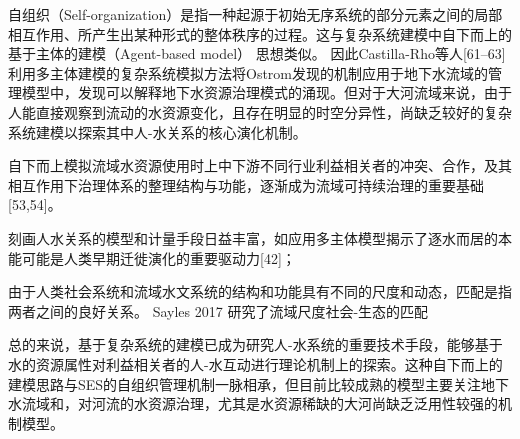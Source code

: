 自组织（Self-organization）是指一种起源于初始无序系统的部分元素之间的局部相互作用、所产生出某种形式的整体秩序的过程。这与复杂系统建模中自下而上的基于主体的建模（Agent-based model） 思想类似。
因此Castilla-Rho等人[61–63]利用多主体建模的复杂系统模拟方法将Ostrom发现的机制应用于地下水流域的管理模型中，发现可以解释地下水资源治理模式的涌现。但对于大河流域来说，由于人能直接观察到流动的水资源变化，且存在明显的时空分异性，尚缺乏较好的复杂系统建模以探索其中人-水关系的核心演化机制。

自下而上模拟流域水资源使用时上中下游不同行业利益相关者的冲突、合作，及其相互作用下治理体系的整理结构与功能，逐渐成为流域可持续治理的重要基础[53,54]。


刻画人水关系的模型和计量手段日益丰富，如应用多主体模型揭示了逐水而居的本能可能是人类早期迁徙演化的重要驱动力[42]；

由于人类社会系统和流域水文系统的结构和功能具有不同的尺度和动态，匹配是指两者之间的良好关系。
Sayles 2017 研究了流域尺度社会-生态的匹配

总的来说，基于复杂系统的建模已成为研究人-水系统的重要技术手段，能够基于水的资源属性对利益相关者的人-水互动进行理论机制上的探索。这种自下而上的建模思路与SES的自组织管理机制一脉相承，但目前比较成熟的模型主要关注地下水流域和，对河流的水资源治理，尤其是水资源稀缺的大河尚缺乏泛用性较强的机制模型。
